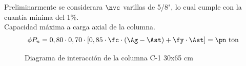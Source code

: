 \noindent Preliminarmente se considerara $\nvc$ varillas de 5/8", lo cual cumple con la cuantía mínima del 1\%.\\
Capacidad máxima a carga axial de la columna.
\begin{align*}
\phi P_{n}=0,80 \cdot 0,70 \cdot\left[0,85 \cdot \fc \cdot\left(\Ag-\Ast\right)+\fy \cdot \Ast\right]=\pn \mathrm{~ton}
\end{align*}
\newpage
\begin{figure}[h!]
    \centering
    \hspace{0mm}
    \caption{Diagrama de interacción de la columna C-1 30x65 cm}
    \label{reqv}
\end{figure}

